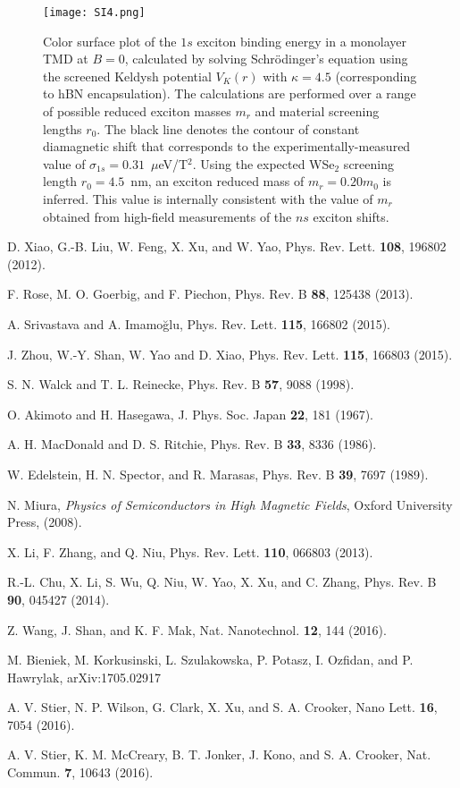 \documentclass[aps,prl,twocolumn]{revtex4-1}
\begin{document}
\begin{figure}[h]
\center
\texttt{[image: SI4.png]}
\caption{Color surface plot of the $1s$ exciton binding energy in a monolayer TMD at $B=0$, calculated by solving Schr\"{o}dinger's equation using the screened Keldysh potential $V_K(r)$ with $\kappa = 4.5$ (corresponding to hBN encapsulation).  The calculations are performed over a range of possible reduced exciton masses $m_r$ and material screening lengths $r_0$. The black line denotes the contour of constant diamagnetic shift that corresponds to the experimentally-measured value of $\sigma_{1s} = 0.31$~$\mu$eV/T$^2$. Using the expected WSe$_2$ screening length $r_0 = 4.5$~nm, an exciton reduced mass of $m_r = 0.20 m_0$ is inferred.  This value is internally consistent with the value of $m_r$ obtained from high-field measurements of the $ns$ exciton shifts.} \label{fig3}
\end{figure}

\begin{references}

D. Xiao, G.-B. Liu, W. Feng, X. Xu, and W. Yao, Phys. Rev. Lett. \textbf{108}, 196802 (2012).

F. Rose, M. O. Goerbig, and F. Piechon, Phys. Rev. B \textbf{88}, 125438 (2013). 

 A. Srivastava and A. Imamo\u{g}lu, Phys. Rev. Lett. \textbf{115}, 166802 (2015).

 J. Zhou, W.-Y. Shan, W. Yao and D. Xiao, Phys. Rev. Lett. \textbf{115}, 166803 (2015).

 S. N. Walck and T. L. Reinecke, Phys. Rev. B \textbf{57}, 9088 (1998).

 O. Akimoto and H. Hasegawa, J. Phys. Soc. Japan \textbf{22}, 181 (1967).

 A. H. MacDonald and D. S. Ritchie, Phys. Rev. B \textbf{33}, 8336 (1986). 

 W. Edelstein, H. N. Spector, and R. Marasas, Phys. Rev. B \textbf{39}, 7697 (1989).

N. Miura, \emph{Physics of Semiconductors in High Magnetic Fields}, Oxford University Press, (2008).

X. Li, F. Zhang, and Q. Niu, Phys. Rev. Lett. \textbf{110}, 066803 (2013).

R.-L. Chu, X. Li, S. Wu, Q. Niu, W. Yao, X. Xu, and C. Zhang, Phys. Rev. B \textbf{90}, 045427 (2014).

 Z. Wang, J. Shan, and K. F. Mak, Nat. Nanotechnol. \textbf{12}, 144 (2016).

M. Bieniek, M. Korkusinski, L. Szulakowska, P. Potasz, I. Ozfidan, and P. Hawrylak, arXiv:1705.02917

 A. V. Stier, N. P. Wilson, G. Clark, X. Xu, and S. A. Crooker, Nano Lett. \textbf{16}, 7054 (2016).

 A. V. Stier, K. M. McCreary, B. T. Jonker, J. Kono, and S. A. Crooker, Nat. Commun. \textbf{7}, 10643 (2016).

\end{references}
\end{document}
